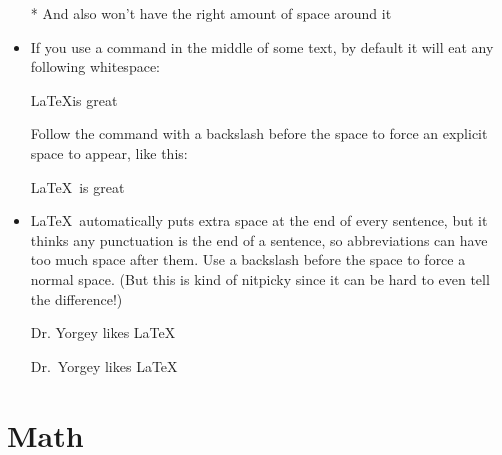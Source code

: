 \documentclass{article}
\begin{document}
\begin{itemize}
\begin{bad}
* And also won't have the right amount of space around it
\end{bad}
\item If you use a command in the middle of some text, by default it
  will eat any following whitespace:
\begin{bad}
\LaTeX is great
\end{bad}
  Follow the command with a backslash before the space to force an
  explicit space to appear, like this:
\begin{good}
\LaTeX\ is great
\end{good}
\item \LaTeX\ automatically puts extra space at the end of every
  sentence, but it thinks any punctuation is the end of a sentence, so
  abbreviations can have too much space after them.  Use a backslash
  before the space to force a normal space.  (But this is kind of nitpicky
  since it can be hard to even tell the difference!)
\begin{bad}
Dr. Yorgey likes \LaTeX
\end{bad}
\begin{good}
Dr.\ Yorgey likes \LaTeX
\end{good}

\end{itemize}

\section*{Math}
\label{sec:math}
\end{document}

